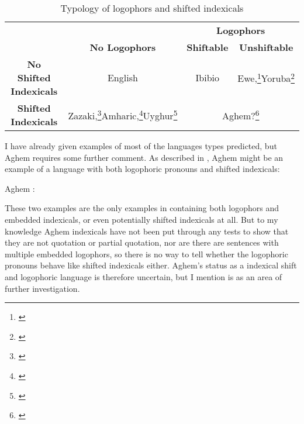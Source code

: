 \documentclass[output=paper]{langscibook}
\begin{document}
\begin{table}
\begin{tabular}{c|c|c|c}
	&	&	\multicolumn{2}{c}{\textbf{Logophors}} \\
	&	\textbf{No Logophors}	&	\textbf{Shiftable}	&	\textbf{Unshiftable} \\ \hline
\textbf{No Shifted Indexicals} &	English	&	Ibibio	&	Ewe,\footnote{\citet{Clements1975,Pearson2015}}Yoruba\footnote{\citet{Adesola2005}}		\\ \hline
	\textbf{Shifted Indexicals}	& Zazaki,\footnote{\citet{Anand2004,Anand2006}}Amharic,\footnote{\citet{Schlenker2003}}Uyghur\footnote{\citet{Sudo2012,Shklovsky2014}}	&	\multicolumn{2}{c}{Aghem?\footnote{\citet{Hyman1979}}}
\end{tabular}
\caption{Typology of logophors and shifted indexicals}\label{type}
\end{table}

I have already given examples of most of the languages types predicted, but Aghem requires some further comment. As described in \citet{Hyman1979}, Aghem might be an example of a language with both logophoric pronouns and shifted indexicals:
\begin{exe}
\ex\label{aghem} Aghem \citep[14]{Hyman1979}:
\begin{xlist}%
	
\end{xlist}
\end{exe}
These two examples are the only examples in \citet{Hyman1979} containing both logophors and embedded indexicals, or even potentially shifted indexicals at all. But to my knowledge Aghem indexicals have not been put through any tests to show that they are not quotation or partial quotation, nor are there are sentences with multiple embedded logophors, so there is no way to tell whether the logophoric pronouns behave like shifted indexicals either. Aghem's status as a indexical shift and logophoric language is therefore uncertain, but I mention is as an area of further investigation.
\end{document}
